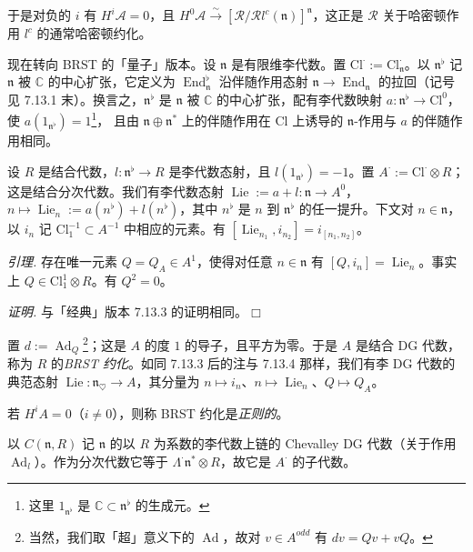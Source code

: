 于是对负的 $i$ 有 $H^{i}\mathcal{A}=0$，且 $H^{0}\mathcal{A}\xrightarrow{\sim}[\mathcal{R}/\mathcal{R}l^{c}(\mathfrak{n})]^{\mathfrak{n}}$，这正是 $\mathcal{R}$ 关于哈密顿作用 $l^{c}$ 的通常哈密顿约化。

 现在转向 BRST 的「量子」版本。设 $\mathfrak{n}$ 是有限维李代数。置 $\mathrm{Cl}^{\cdot}:=\mathrm{Cl}^{\cdot}_{\mathfrak{n}}$。以 $\mathfrak{n}^{\flat}$ 记 $\mathfrak{n}$ 被 $\mathbb{C}$ 的中心扩张，它定义为 $\operatorname{End}^{\flat}_{\mathfrak{n}}$ 沿伴随作用态射 $\mathfrak{n}\to\operatorname{End}_{\mathfrak{n}}$ 的拉回（记号见 7.13.1 末）。换言之，$\mathfrak{n}^{\flat}$ 是 $\mathfrak{n}$ 被 $\mathbb{C}$ 的中心扩张，配有李代数映射 $a:\mathfrak{n}^{\flat}\to\mathrm{Cl}^{0}$，使 $a(1_{\mathfrak{n}^{\flat}})=1$\footnote{这里 $1_{\mathfrak{n}^{\flat}}$ 是 $\mathbb{C}\subset\mathfrak{n}^{\flat}$ 的生成元。}，%
且由 $\mathfrak{n}\oplus\mathfrak{n}^{*}$ 上的伴随作用在 $\mathrm{Cl}$ 上诱导的 $\mathfrak{n}$-作用与 $a$ 的伴随作用相同。

设 $R$ 是结合代数，$l:\mathfrak{n}^{\flat}\to R$ 是李代数态射，且 $l(1_{\mathfrak{n}^{\flat}})=-1$。置 $A^{\cdot}:=\mathrm{Cl}^{\cdot}\otimes R$；这是结合分次代数。我们有李代数态射 $\operatorname{Lie}:=a+l:\mathfrak{n}\to A^{0}$，$n\mapsto\operatorname{Lie}_n:=a(n^{\flat})+l(n^{\flat})$，其中 $n^{\flat}$ 是 $n$ 到 $\mathfrak{n}^{\flat}$ 的任一提升。下文对 $n\in\mathfrak{n}$，以 $i_n$ 记 $\mathrm{Cl}^{-1}_1\subset A^{-1}$ 中相应的元素。有 $[\operatorname{Lie}_{n_1},i_{n_2}]=i_{[n_1,n_2]}$。

 \emph{引理.} 存在唯一元素 $Q=Q_A\in A^{1}$，使得对任意 $n\in\mathfrak{n}$ 有 $[Q,i_n]=\operatorname{Lie}_n$。事实上 $Q\in\mathrm{Cl}^{1}_1\otimes R$。有 $Q^{2}=0$。

\emph{证明.} 与「经典」版本 7.13.3 的证明相同。\hfill$\Box$

置 $d:=\operatorname{Ad}_Q$\footnote{当然，我们取「超」意义下的 $\operatorname{Ad}$，故对 $v\in A^{odd}$ 有 $dv=Qv+vQ$。}；这是 $A$ 的度 $1$ 的导子，且平方为零。于是 $A$ 是结合 DG 代数，称为 $R$ 的\emph{BRST 约化}。如同 7.13.3 后的注与 7.13.4 那样，我们有李 DG 代数的典范态射 $\operatorname{Lie}:\mathfrak{n}_{\heartsuit}\to A$，其分量为 $n\mapsto i_n$、$n\mapsto\operatorname{Lie}_n$、$Q\mapsto Q_A$。

若 $H^{i}A=0$（$i\ne0$），则称 BRST 约化是\emph{正则的}。

以 $C(\mathfrak{n},R)$ 记 $\mathfrak{n}$ 的以 $R$ 为系数的李代数上链的 Chevalley DG 代数（关于作用 $\operatorname{Ad}_l$）。作为分次代数它等于 $\Lambda^{\cdot}\mathfrak{n}^{*}\otimes R$，故它是 $A^{\cdot}$ 的子代数。

